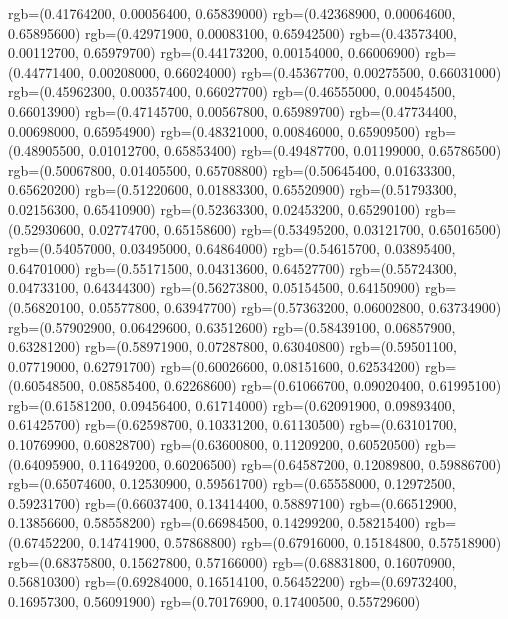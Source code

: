 {{        rgb=(0.41764200, 0.00056400, 0.65839000)
        rgb=(0.42368900, 0.00064600, 0.65895600)
        rgb=(0.42971900, 0.00083100, 0.65942500)
        rgb=(0.43573400, 0.00112700, 0.65979700)
        rgb=(0.44173200, 0.00154000, 0.66006900)
        rgb=(0.44771400, 0.00208000, 0.66024000)
        rgb=(0.45367700, 0.00275500, 0.66031000)
        rgb=(0.45962300, 0.00357400, 0.66027700)
        rgb=(0.46555000, 0.00454500, 0.66013900)
        rgb=(0.47145700, 0.00567800, 0.65989700)
        rgb=(0.47734400, 0.00698000, 0.65954900)
        rgb=(0.48321000, 0.00846000, 0.65909500)
        rgb=(0.48905500, 0.01012700, 0.65853400)
        rgb=(0.49487700, 0.01199000, 0.65786500)
        rgb=(0.50067800, 0.01405500, 0.65708800)
        rgb=(0.50645400, 0.01633300, 0.65620200)
        rgb=(0.51220600, 0.01883300, 0.65520900)
        rgb=(0.51793300, 0.02156300, 0.65410900)
        rgb=(0.52363300, 0.02453200, 0.65290100)
        rgb=(0.52930600, 0.02774700, 0.65158600)
        rgb=(0.53495200, 0.03121700, 0.65016500)
        rgb=(0.54057000, 0.03495000, 0.64864000)
        rgb=(0.54615700, 0.03895400, 0.64701000)
        rgb=(0.55171500, 0.04313600, 0.64527700)
        rgb=(0.55724300, 0.04733100, 0.64344300)
        rgb=(0.56273800, 0.05154500, 0.64150900)
        rgb=(0.56820100, 0.05577800, 0.63947700)
        rgb=(0.57363200, 0.06002800, 0.63734900)
        rgb=(0.57902900, 0.06429600, 0.63512600)
        rgb=(0.58439100, 0.06857900, 0.63281200)
        rgb=(0.58971900, 0.07287800, 0.63040800)
        rgb=(0.59501100, 0.07719000, 0.62791700)
        rgb=(0.60026600, 0.08151600, 0.62534200)
        rgb=(0.60548500, 0.08585400, 0.62268600)
        rgb=(0.61066700, 0.09020400, 0.61995100)
        rgb=(0.61581200, 0.09456400, 0.61714000)
        rgb=(0.62091900, 0.09893400, 0.61425700)
        rgb=(0.62598700, 0.10331200, 0.61130500)
        rgb=(0.63101700, 0.10769900, 0.60828700)
        rgb=(0.63600800, 0.11209200, 0.60520500)
        rgb=(0.64095900, 0.11649200, 0.60206500)
        rgb=(0.64587200, 0.12089800, 0.59886700)
        rgb=(0.65074600, 0.12530900, 0.59561700)
        rgb=(0.65558000, 0.12972500, 0.59231700)
        rgb=(0.66037400, 0.13414400, 0.58897100)
        rgb=(0.66512900, 0.13856600, 0.58558200)
        rgb=(0.66984500, 0.14299200, 0.58215400)
        rgb=(0.67452200, 0.14741900, 0.57868800)
        rgb=(0.67916000, 0.15184800, 0.57518900)
        rgb=(0.68375800, 0.15627800, 0.57166000)
        rgb=(0.68831800, 0.16070900, 0.56810300)
        rgb=(0.69284000, 0.16514100, 0.56452200)
        rgb=(0.69732400, 0.16957300, 0.56091900)
        rgb=(0.70176900, 0.17400500, 0.55729600)
}}
